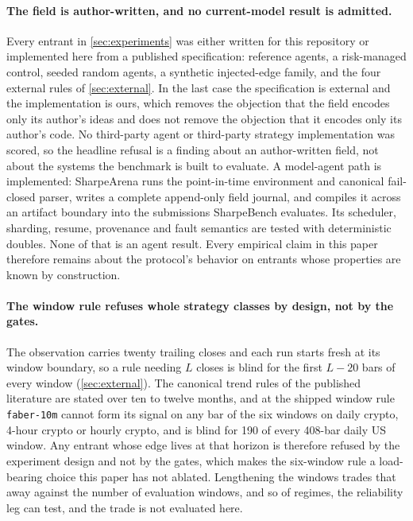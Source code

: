 \paragraph{The field is author-written, and no current-model result is admitted.} Every entrant in \cref{sec:experiments} was either written for this repository or implemented here from a published specification: reference agents, a risk-managed control, seeded random agents, a synthetic injected-edge family, and the four external rules of \cref{sec:external}. In the last case the specification is external and the implementation is ours, which removes the objection that the field encodes only its author's ideas and does not remove the objection that it encodes only its author's code. No third-party agent or third-party strategy implementation was scored, so the headline refusal is a finding about an author-written field, not about the systems the benchmark is built to evaluate. A model-agent path is implemented: SharpeArena \citep{toca2026sharpearena} runs the point-in-time environment and canonical fail-closed parser, writes a complete append-only field journal, and compiles it across an artifact boundary into the submissions SharpeBench evaluates. Its scheduler, sharding, resume, provenance and fault semantics are tested with deterministic doubles. None of that is an agent result. Every empirical claim in this paper therefore remains about the protocol's behavior on entrants whose properties are known by construction.

\paragraph{The window rule refuses whole strategy classes by design, not by the gates.} The observation carries twenty trailing closes and each run starts fresh at its window boundary, so a rule needing $L$ closes is blind for the first $L-20$ bars of every window (\cref{sec:external}). The canonical trend rules of the published literature are stated over ten to twelve months, and at the shipped window rule \texttt{faber-10m} cannot form its signal on any bar of the six windows on daily crypto, 4-hour crypto or hourly crypto, and is blind for 190 of every 408-bar daily US window. Any entrant whose edge lives at that horizon is therefore refused by the experiment design and not by the gates, which makes the six-window rule a load-bearing choice this paper has not ablated. Lengthening the windows trades that away against the number of evaluation windows, and so of regimes, the reliability leg can test, and the trade is not evaluated here.

